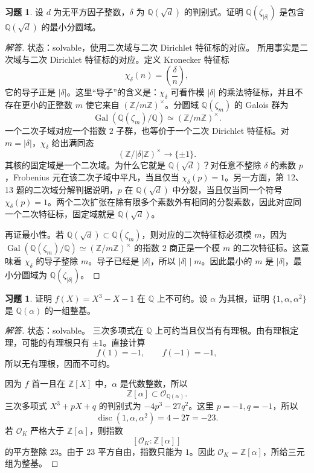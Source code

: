 \documentclass[11pt,a4paper,openany]{ctexbook}
\numberwithin{equation}{chapter}
\newcommand{\Q}{\mathbb{Q}}
\newcommand{\Z}{\mathbb{Z}}
\newcommand{\Gal}{\operatorname{Gal}}
\theoremstyle{plain}
\theoremstyle{definition}
\newtheorem{exercise}[theorem]{习题}
\theoremstyle{remark}
\begin{document}
\begin{exercise}
设 $d$ 为无平方因子整数，$\delta$ 为 $\Q(\sqrt d)$ 的判别式。证明 $\Q(\zeta_{|\delta|})$ 是包含 $\Q(\sqrt d)$ 的最小分圆域。
\end{exercise}

\begin{proof}[解答]
状态：solvable，使用二次域与二次 Dirichlet 特征标的对应。
所用事实是二次域与二次 Dirichlet 特征标的对应。定义 Kronecker 特征标
\[
\chi_\delta(n)=\left(\frac{\delta}{n}\right),
\]
它的导子正是 $|\delta|$。这里“导子”的含义是：$\chi_\delta$ 可看作模
$|\delta|$ 的乘法特征标，并且不存在更小的正整数 $m$ 使它来自
$(\Z/m\Z)^\times$。分圆域 $\Q(\zeta_m)$ 的 Galois 群为
\[
\Gal(\Q(\zeta_m)/\Q)\simeq(\Z/m\Z)^\times.
\]
一个二次子域对应一个指数 $2$ 子群，也等价于一个二次 Dirichlet 特征标。对 $m=|\delta|$，$\chi_\delta$ 给出满同态
\[
(\Z/|\delta|\Z)^\times\to\{\pm1\}.
\]
其核的固定域是一个二次域。为什么它就是 $\Q(\sqrt d)$？对任意不整除
$\delta$ 的素数 $p$，Frobenius 元在该二次子域中平凡，当且仅当
$\chi_\delta(p)=1$。另一方面，第 12、13 题的二次域分解判据说明，$p$ 在
$\Q(\sqrt d)$ 中分裂，当且仅当同一个符号 $\chi_\delta(p)=1$。两个二次扩张在除有限多个素数外有相同的分裂素数，因此对应同一个二次特征标，固定域就是
$\Q(\sqrt d)$。

再证最小性。若 $\Q(\sqrt d)\subset\Q(\zeta_m)$，则对应的二次特征标必须模
$m$，因为 $\Gal(\Q(\zeta_m)/\Q)\simeq(\Z/m\Z)^\times$ 的指数 $2$ 商正是一个模
$m$ 的二次特征标。这意味着 $\chi_\delta$ 的导子整除 $m$。导子已经是
$|\delta|$，所以 $|\delta|\mid m$。因此最小的 $m$ 是 $|\delta|$，最小分圆域为
$\Q(\zeta_{|\delta|})$。
\end{proof}

\begin{exercise}
证明 $f(X)=X^3-X-1$ 在 $\Q$ 上不可约。设 $\alpha$ 为其根，证明 $\{1,\alpha,\alpha^2\}$ 是 $\Q(\alpha)$ 的一组整基。
\end{exercise}

\begin{proof}[解答]
状态：solvable。
三次多项式在 $\Q$ 上可约当且仅当有有理根。由有理根定理，可能的有理根只有 $\pm1$。直接计算
\[
f(1)=-1,\qquad f(-1)=-1,
\]
所以无有理根，因而不可约。

因为 $f$ 首一且在 $\Z[X]$ 中，$\alpha$ 是代数整数，所以
\[
\Z[\alpha]\subset\mathcal O_{\Q(\alpha)}.
\]
三次多项式 $X^3+pX+q$ 的判别式为 $-4p^3-27q^2$。这里 $p=-1,q=-1$，所以
\[
\operatorname{disc}(1,\alpha,\alpha^2)=4-27=-23.
\]
若 $\mathcal O_K$ 严格大于 $\Z[\alpha]$，则指数
\[
[\mathcal O_K:\Z[\alpha]]
\]
的平方整除 $23$。由于 $23$ 平方自由，指数只能为 $1$。因此 $\mathcal O_K=\Z[\alpha]$，所给三元组为整基。
\end{proof}
\end{document}
